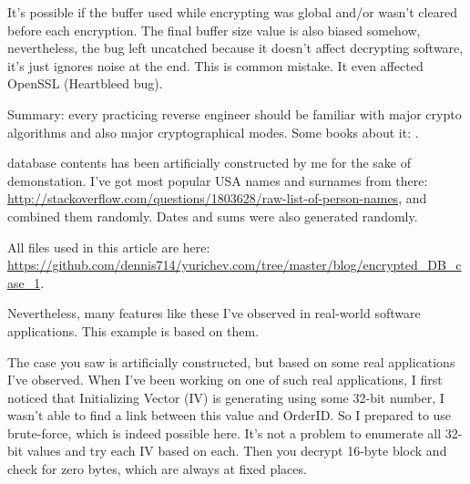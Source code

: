It's possible if the buffer used while encrypting was global and/or wasn't cleared before
each encryption.
The final buffer size value is also biased somehow, nevertheless, the bug left uncatched
because it doesn't affect decrypting software, it's just ignores noise at the end.
This is common mistake.
It even affected OpenSSL (Heartbleed bug).


Summary:
every practicing reverse engineer should be familiar with major crypto algorithms and
also major cryptographical modes.
Some books about it: .

 database contents has been artificially constructed by me for the sake of demonstation.
I've got most popular USA names and surnames from there: \url{http://stackoverflow.com/questions/1803628/raw-list-of-person-names},
and combined them randomly.
Dates and sums were also generated randomly.

All files used in this article are here: \url{https://github.com/dennis714/yurichev.com/tree/master/blog/encrypted_DB_case_1}.

Nevertheless, many features like these I've observed in real-world software applications.
This example is based on them.


The case you saw is artificially constructed, but based on some real applications I've observed.
When I've been working on one of such real applications, 
I first noticed that Initializing Vector (IV) is generating using some 32-bit number, I wasn't able to find a link between this value and OrderID.
So I prepared to use brute-force, which is indeed possible here.
It's not a problem to enumerate all 32-bit values and try each IV based on each.
Then you decrypt 16-byte block and check for zero bytes, which are always at fixed places.

